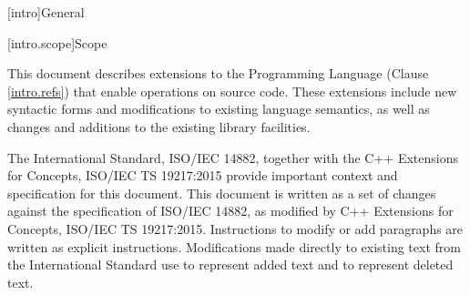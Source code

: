 
[intro]{General}

[intro.scope]{Scope}

\pnum
This document describes extensions to the \Cpp Programming
Language (Clause \ref{intro.refs}) that enable operations on source code. These
extensions include new syntactic forms and modifications to existing language
semantics, as well as changes and additions to the existing library facilities.

\pnum
The International Standard, ISO/IEC 14882, together with the C++ Extensions for
Concepts, ISO/IEC TS 19217:2015 provide important context and specification for
this document. This document is written as a set of changes against the
specification of ISO/IEC 14882, as modified by C++ Extensions for Concepts,
ISO/IEC TS 19217:2015.  Instructions to modify or add paragraphs are written as
explicit instructions.  Modifications made directly to existing text from the
International Standard use  to represent added text and
 to represent deleted text.
